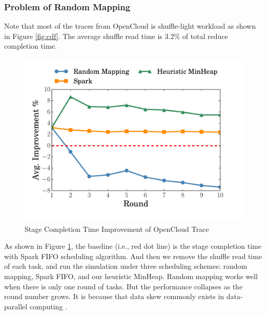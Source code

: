 \subsubsection{Problem of Random Mapping}\label{randomassign}
Note that most of the traces from OpenCloud is shuffle-light workload as shown in Figure \ref{fig:cdf}. 
The average shuffle read time is 3.2\% of total reduce completion time.
\begin{figure}
	\centering
	\includegraphics[width=0.6\linewidth]{fig/sim}
	\caption{Stage Completion Time Improvement of OpenCloud Trace}
	\label{fig:sim}
	\vspace{-1em}
\end{figure}
As shown in Figure \ref{fig:sim}, the baseline (i.e., red dot line) is the stage completion time with Spark FIFO scheduling algorithm. 
And then we remove the shuffle read time of each task, and run the simulation under three scheduling schemes: random mapping, Spark FIFO, and our heuristic MinHeap.
Random mapping works well when there is only one round of tasks. 
But the performance collapses as the round number grows. 
It is because that data skew commonly exists in data-parallel computing \cite{skewtune, reining, gufler2012load}. 

